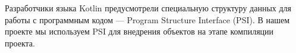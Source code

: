 \documentclass[conference]{IEEEtran}
\begin{document}
Разработчики языка Kotlin предусмотрели специальную структуру данных для работы
с программным кодом --- Program Structure Interface (PSI).
В нашем проекте мы используем PSI для внедрения объектов на этапе компиляции
проекта. 




\end{document}
